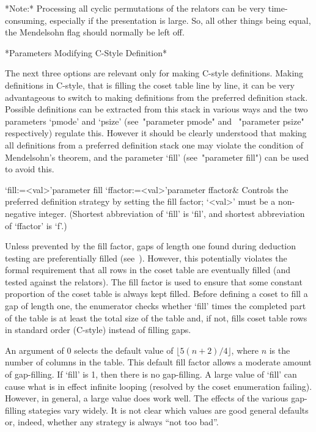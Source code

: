 *Note:* Processing all cyclic permutations of the relators can be very
time-consuming,  especially if  the  presentation is  large.  So,  all
other things being equal, the  Mendelsohn flag should normally be left
off.

*Parameters Modifying C-Style Definition*

The  next  three  options  are   relevant  only  for  making   C-style
definitions.  Making definitions in C-style, that is filling the coset
table line  by line, it can  be very advantageous to  switch to making
definitions from the preferred definition stack.  Possible definitions
can  be  extracted  from  this  stack  in various  ways  and  the  two
parameters `pmode'  and `psize' (see~"parameter  pmode" and ~"parameter
psize"  respectively)  regulate this.  However  it  should be  clearly
understood that  making  all definitions  from  a preferred  definition
stack one may  violate the condition of Mendelsohn's  theorem, and the
parameter `fill' (see~"parameter fill") can be used to avoid this.

\>`fill:=<val>'{parameter fill}
\>`ffactor:=<val>'{parameter ffactor}&
Controls the preferred definition strategy by setting the fill factor;
`<val>' must be a non-negative integer.
(Shortest abbreviation of `fill' is `fil', and shortest abbreviation of 
`ffactor' is `f'.)

Unless prevented by  the fill factor, gaps of  length one found during
deduction   testing   are   preferentially  filled   (see~\cite{Hav}).
However,  this potentially  violates the  formal requirement  that all
rows in the coset table  are eventually filled (and tested against the
relators).   The fill  factor is  used  to ensure  that some  constant
proportion of the coset table  is always kept filled.  Before defining
a coset  to fill a  gap of length  one, the enumerator  checks whether
`fill' times  the completed part  of the table  is at least  the total
size of  the table  and, if  not, fills coset  table rows  in standard
order (C-style) instead of filling gaps.

An  argument of  0  selects  the default  value  of $\lfloor  5(n+2)/4
\rfloor$,  where $n$  is the  number of  columns in  the  table.  This
default  fill factor  allows  a moderate  amount  of gap-filling.   If
`fill' is  1, then there is  no gap-filling.  A large  value of `fill'
can cause  what is in effect  infinite looping (resolved  by the coset
enumeration failing).   However, in general,  a large value  does work
well.  The  effects of the various gap-filling  stategies vary widely.
It is  not clear  which values are  good general defaults  or, indeed,
whether any strategy is always ``not too bad''.

